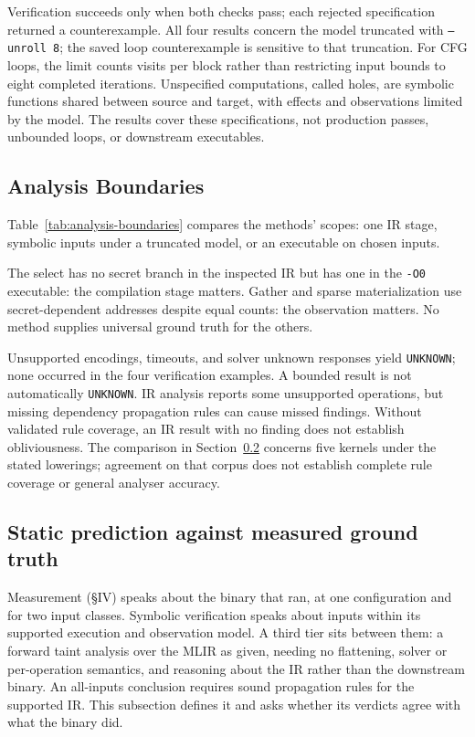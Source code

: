 Verification succeeds only when both checks pass; each rejected specification returned a counterexample.
All four results concern the model truncated with \texttt{--unroll 8}; the saved loop counterexample is sensitive to that truncation.
For CFG loops, the limit counts visits per block rather than restricting input bounds to eight completed iterations.
Unspecified computations, called holes, are symbolic functions shared between source and target, with effects and observations limited by the model.
The results cover these specifications, not production passes, unbounded loops, or downstream executables.

\subsection{Analysis Boundaries}
\label{sec:evaluation:boundaries}

Table~\ref{tab:analysis-boundaries} compares the methods' scopes: one IR stage, symbolic inputs under a truncated model, or an executable on chosen inputs.


The select has no secret branch in the inspected IR but has one in the \texttt{-O0} executable: the compilation stage matters.
Gather and sparse materialization use secret-dependent addresses despite equal counts: the observation matters.
No method supplies universal ground truth for the others.

Unsupported encodings, timeouts, and solver unknown responses yield \texttt{UNKNOWN}; none occurred in the four verification examples.
A bounded result is not automatically \texttt{UNKNOWN}.
IR analysis reports some unsupported operations, but missing dependency propagation rules can cause missed findings.
Without validated rule coverage, an IR result with no finding does not establish obliviousness.
The comparison in Section~\ref{sec:evaluation:static} concerns five kernels under the stated lowerings; agreement on that corpus does not establish complete rule coverage or general analyser accuracy.

\subsection{Static prediction against measured ground truth}
\label{sec:evaluation:static}

Measurement (§IV) speaks about the binary that ran, at one configuration and for two input classes.
Symbolic verification speaks about inputs within its supported execution and observation model.
A third tier sits between them: a forward taint analysis over the MLIR as given, needing no flattening, solver or per-operation semantics, and reasoning about the IR rather than the downstream binary.
An all-inputs conclusion requires sound propagation rules for the supported IR.
This subsection defines it and asks whether its verdicts agree with what the binary did.

